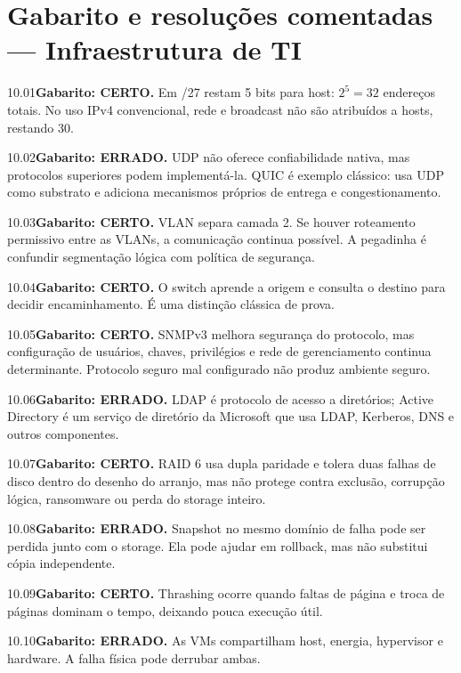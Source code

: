 \section{Gabarito e resoluções comentadas — Infraestrutura de TI}

\begin{solucao}{10.01}\textbf{Gabarito: CERTO.} Em /27 restam 5 bits para host: $2^5=32$ endereços totais. No uso IPv4 convencional, rede e broadcast não são atribuídos a hosts, restando 30.\end{solucao}
\begin{solucao}{10.02}\textbf{Gabarito: ERRADO.} UDP não oferece confiabilidade nativa, mas protocolos superiores podem implementá-la. QUIC é exemplo clássico: usa UDP como substrato e adiciona mecanismos próprios de entrega e congestionamento.\end{solucao}
\begin{solucao}{10.03}\textbf{Gabarito: CERTO.} VLAN separa camada 2. Se houver roteamento permissivo entre as VLANs, a comunicação continua possível. A pegadinha é confundir segmentação lógica com política de segurança.\end{solucao}
\begin{solucao}{10.04}\textbf{Gabarito: CERTO.} O switch aprende a origem e consulta o destino para decidir encaminhamento. É uma distinção clássica de prova.\end{solucao}
\begin{solucao}{10.05}\textbf{Gabarito: CERTO.} SNMPv3 melhora segurança do protocolo, mas configuração de usuários, chaves, privilégios e rede de gerenciamento continua determinante. Protocolo seguro mal configurado não produz ambiente seguro.\end{solucao}
\begin{solucao}{10.06}\textbf{Gabarito: ERRADO.} LDAP é protocolo de acesso a diretórios; Active Directory é um serviço de diretório da Microsoft que usa LDAP, Kerberos, DNS e outros componentes.\end{solucao}
\begin{solucao}{10.07}\textbf{Gabarito: CERTO.} RAID 6 usa dupla paridade e tolera duas falhas de disco dentro do desenho do arranjo, mas não protege contra exclusão, corrupção lógica, ransomware ou perda do storage inteiro.\end{solucao}
\begin{solucao}{10.08}\textbf{Gabarito: ERRADO.} Snapshot no mesmo domínio de falha pode ser perdida junto com o storage. Ela pode ajudar em rollback, mas não substitui cópia independente.\end{solucao}
\begin{solucao}{10.09}\textbf{Gabarito: CERTO.} Thrashing ocorre quando faltas de página e troca de páginas dominam o tempo, deixando pouca execução útil.\end{solucao}
\begin{solucao}{10.10}\textbf{Gabarito: ERRADO.} As VMs compartilham host, energia, hypervisor e hardware. A falha física pode derrubar ambas.\end{solucao}


